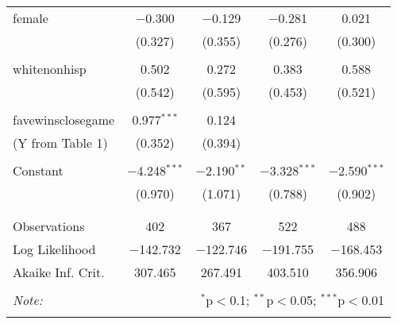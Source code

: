 \documentclass{article}
\begin{document}
\begin{table}[!htbp]
\begin{tabular}{@{\extracolsep{5pt}}lcccc}
 female & $-$0.300 & $-$0.129 & $-$0.281 & 0.021 \\ 
  & (0.327) & (0.355) & (0.276) & (0.300) \\ 
  & & & & \\ 
 whitenonhisp & 0.502 & 0.272 & 0.383 & 0.588 \\ 
  & (0.542) & (0.595) & (0.453) & (0.521) \\ 
  & & & & \\ 
 favewinsclosegame & 0.977$^{***}$ & 0.124 &  &  \\ 
 (Y from Table 1) & (0.352) & (0.394) &  &  \\ 
  & & & & \\ 
 Constant & $-$4.248$^{***}$ & $-$2.190$^{**}$ & $-$3.328$^{***}$ & $-$2.590$^{***}$ \\ 
  & (0.970) & (1.071) & (0.788) & (0.902) \\ 
  & & & & \\ 
\hline \\[-1.8ex] 
Observations & 402 & 367 & 522 & 488 \\ 
Log Likelihood & $-$142.732 & $-$122.746 & $-$191.755 & $-$168.453 \\ 
Akaike Inf. Crit. & 307.465 & 267.491 & 403.510 & 356.906 \\ 
\hline 
\hline \\[-1.8ex] 
\textit{Note:}  & \multicolumn{4}{r}{$^{*}$p$<$0.1; $^{**}$p$<$0.05; $^{***}$p$<$0.01} \\ 
\normalsize 
\end{tabular} 
\end{table} 
\end{document}
